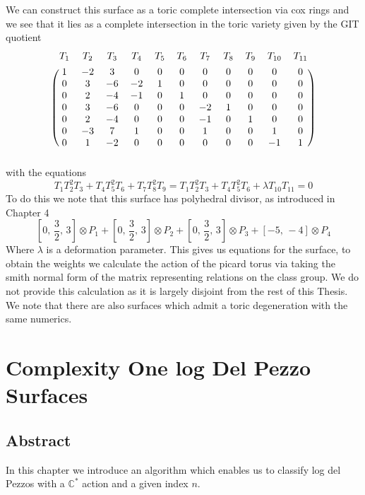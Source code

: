 \documentclass[12pt,a4paper]{book}      %
\theoremstyle{definition}
\newcommand{\mb}[1]{\mathbb{#1}}
\begin{document}
We can construct this surface as a toric complete intersection via cox rings \cite{HausenCox} and we see that it lies as a complete intersection in the toric variety given by the GIT quotient
\[
\begin{blockarray}{cc cc cc cc cc c}
	T_1 & T_2 & T_3 & T_4 & T_5 & T_6 & T_7 & T_8 & T_9 & T_{10} & T_{11} \\[4pt]
      \begin{block}{(cc cc cc cc cc c)}
	1&-2&3&0&0&0&0&0&0&0&0 \\ 
	0&3&-6&-2&1&0&0&0&0&0&0 \\
	0&2&-4&-1&0&1&0&0&0&0&0 \\
	0&3&-6&0&0&0&-2&1&0&0&0 \\ 
	0&2&-4&0&0&0&-1&0&1&0&0 \\
	0&-3&7&1&0&0&1&0&0&1&0 \\
	0&1&-2&0&0&0&0&0&0&-1&1 \\
      \end{block}
\end{blockarray}
\]
with the equations 
\[
T_1 T_2^2 T_3 + T_4 T_5^2 T_6 + T_7 T_8^2 T_9 = 
T_1 T_2^2 T_3 + T_4 T_5^2 T_6  + \lambda T_{10} T_{11} = 0
\]
To do this we note that this surface has polyhedral divisor, as introduced in Chapter 4
\[ 
\left[ 0, \, \frac{3}{2}, \, 3 \right] \otimes P_1 + \left[ 0, \, \frac{3}{2}, \, 3 \right] \otimes P_2 + \left[ 0, \, \frac{3}{2}, \, 3 \right] \otimes P_3 + \left[ -5, \, -4 \right] \otimes P_4
\]
Where $\lambda$ is a deformation parameter. This gives us equations for the surface, to obtain the weights we calculate the action of the picard torus via taking the smith normal form of the matrix representing relations on the class group. We do not provide this calculation as it is largely disjoint from the rest of this Thesis. We note that there are also surfaces which admit a toric degeneration with the same numerics.


\chapter{Complexity One log Del Pezzo Surfaces}

\section{Abstract}

In this chapter we introduce an algorithm which enables us to classify log del Pezzos with a $\mb{C}^*$ action and a given index $n$.
\end{document}
